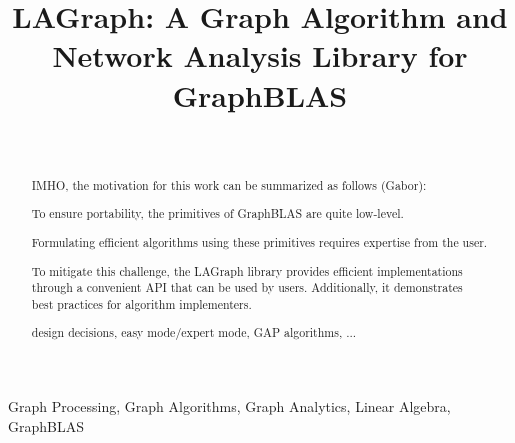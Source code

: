\documentclass[conference]{IEEEtran}
\begin{document}
\title{LAGraph: A Graph Algorithm and Network Analysis Library for GraphBLAS}

\author{ %
 \\
}

\maketitle

\begin{abstract}
IMHO, the motivation for this work can be summarized as follows (Gabor):

To ensure portability, the primitives of GraphBLAS are quite low-level.

Formulating efficient algorithms using these primitives requires expertise from the user.

To mitigate this challenge, the LAGraph library provides efficient implementations through a convenient API that can be used by users. Additionally, it demonstrates best practices for algorithm implementers.

design decisions, easy mode/expert mode, GAP algorithms, ...
\end{abstract}

\begin{IEEEkeywords}
Graph Processing, Graph Algorithms, Graph Analytics, Linear Algebra, GraphBLAS
\end{IEEEkeywords}





















\end{document}
